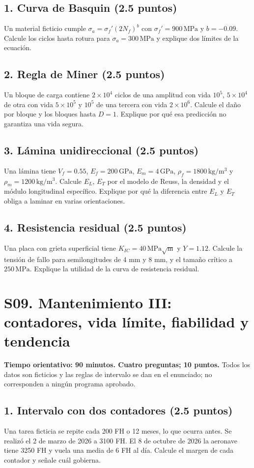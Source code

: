 \section*{1. Curva de Basquin (2.5 puntos)}
Un material ficticio cumple $\sigma_a=\sigma_f'(2N_f)^b$ con $\sigma_f'=900\,\mathrm{MPa}$ y $b=-0.09$. Calcule los ciclos hasta rotura para $\sigma_a=300\,\mathrm{MPa}$ y explique dos límites de la ecuación.

\section*{2. Regla de Miner (2.5 puntos)}
Un bloque de carga contiene $2\times10^4$ ciclos de una amplitud con vida $10^5$, $5\times10^4$ de otra con vida $5\times10^5$ y $10^5$ de una tercera con vida $2\times10^6$. Calcule el daño por bloque y los bloques hasta $D=1$. Explique por qué esa predicción no garantiza una vida segura.

\section*{3. Lámina unidireccional (2.5 puntos)}
Una lámina tiene $V_f=0.55$, $E_f=200\,\mathrm{GPa}$, $E_m=4\,\mathrm{GPa}$, $\rho_f=1800\,\mathrm{kg/m^3}$ y $\rho_m=1200\,\mathrm{kg/m^3}$. Calcule $E_L$, $E_T$ por el modelo de Reuss, la densidad y el módulo longitudinal específico. Explique por qué la diferencia entre $E_L$ y $E_T$ obliga a laminar en varias orientaciones.

\section*{4. Resistencia residual (2.5 puntos)}
Una placa con grieta superficial tiene $K_{IC}=40\,\mathrm{MPa\sqrt m}$ y $Y=1.12$. Calcule la tensión de fallo para semilongitudes de 4 mm y 8 mm, y el tamaño crítico a $250\,\mathrm{MPa}$. Explique la utilidad de la curva de resistencia residual.

\chapter{S09. Mantenimiento III: contadores, vida límite, fiabilidad y tendencia}
\noindent\textbf{Tiempo orientativo: 90 minutos. Cuatro preguntas; 10 puntos.}
Todos los datos son ficticios y las reglas de intervalo se dan en el enunciado; no corresponden a ningún programa aprobado.
\section*{1. Intervalo con dos contadores (2.5 puntos)}
Una tarea ficticia se repite cada 200 FH o 12 meses, lo que ocurra antes. Se realizó el 2 de marzo de 2026 a 3100 FH. El 8 de octubre de 2026 la aeronave tiene 3250 FH y vuela una media de 6 FH al día. Calcule el margen de cada contador y señale cuál gobierna.

